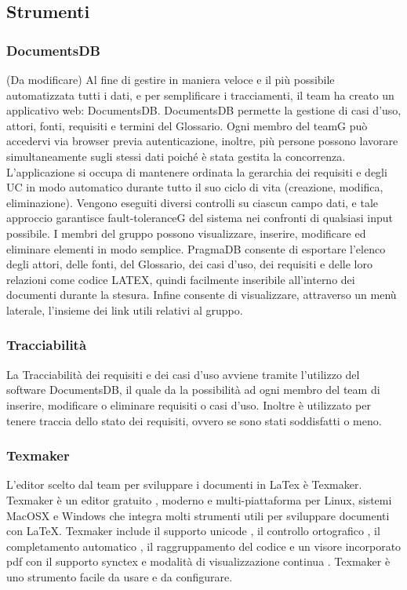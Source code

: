 \subsection{Strumenti}

\subsubsection{DocumentsDB}(Da modificare)
Al fine di gestire in maniera veloce e il più possibile automatizzata tutti i dati, e
per semplificare i tracciamenti, il team ha creato un applicativo web: DocumentsDB.
DocumentsDB permette la gestione di casi d’uso, attori, fonti, requisiti e termini del Glossario. Ogni membro del teamG può accedervi via browser previa autenticazione, inoltre, più persone possono lavorare simultaneamente sugli stessi dati poiché è stata gestita la concorrenza. L’applicazione si occupa di mantenere ordinata la gerarchia dei requisiti e degli UC in modo automatico durante tutto il suo ciclo di vita (creazione, modifica, eliminazione).
Vengono eseguiti diversi controlli su ciascun campo dati, e tale approccio garantisce fault-toleranceG del sistema nei confronti di qualsiasi input possibile. I membri del gruppo possono visualizzare, inserire, modificare ed eliminare elementi in modo semplice. PragmaDB consente di esportare l’elenco degli attori, delle fonti, del Glossario, dei casi d’uso, dei requisiti e delle loro relazioni come codice LATEX, quindi facilmente inseribile all’interno dei documenti durante la stesura. Infine consente di visualizzare,
attraverso un menù laterale, l’insieme dei link utili relativi al gruppo.

\subsubsection{Tracciabilità}
La Tracciabilità dei requisiti e dei casi d'uso avviene tramite l'utilizzo del software DocumentsDB, il quale da la possibilità ad ogni membro del team di inserire, modificare o eliminare requisiti o casi d'uso. Inoltre è utilizzato per tenere traccia dello stato dei requisiti, ovvero se sono stati soddisfatti o meno.

\subsubsection{Texmaker}
L'editor scelto dal team per sviluppare i documenti in LaTex è Texmaker.  
Texmaker è un editor gratuito , moderno e multi-piattaforma per Linux, sistemi MacOSX e Windows che integra molti strumenti utili per sviluppare documenti con LaTeX.
Texmaker include il supporto unicode , il controllo ortografico , il completamento automatico , il raggruppamento del codice  e un visore incorporato pdf con il supporto synctex e modalità di visualizzazione continua .
Texmaker è uno strumento facile da usare e da configurare.


